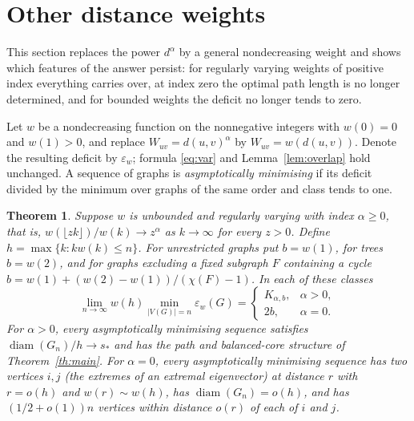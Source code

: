 \documentclass[11pt,a4paper]{article}
\newtheorem{theorem}{Theorem}
\theoremstyle{definition}
\newcommand{\eps}{\varepsilon}
\newcommand{\diam}{\operatorname{diam}}
\begin{document}
\section{Other distance weights}\label{sec:weights}
This section replaces the power $d^\alpha$ by a general nondecreasing weight and shows which features of the answer persist: for regularly varying weights of positive index everything carries over, at index zero the optimal path length is no longer determined, and for bounded weights the deficit no longer tends to zero.

Let $w$ be a nondecreasing function on the nonnegative integers with $w(0)=0$ and $w(1)>0$, and replace $W_{uv}=d(u,v)^\alpha$ by $W_{uv}=w(d(u,v))$. Denote the resulting deficit by $\eps_w$; formula \eqref{eq:var} and Lemma~\ref{lem:overlap} hold unchanged. A sequence of graphs is \emph{asymptotically minimising} if its deficit divided by the minimum over graphs of the same order and class tends to one.

\begin{theorem}\label{th:regular}
Suppose $w$ is unbounded and regularly varying with index $\alpha\ge0$, that is, $w(\lfloor zk\rfloor)/w(k)\to z^\alpha$ as $k\to\infty$ for every $z>0$. Define $h=\max\{k:kw(k)\le n\}$. For unrestricted graphs put $b=w(1)$, for trees $b=w(2)$, and for graphs excluding a fixed subgraph $F$ containing a cycle $b=w(1)+(w(2)-w(1))/(\chi(F)-1)$. In each of these classes
\[
 \lim_{n\to\infty} w(h)\min_{|V(G)|=n}\eps_w(G)
 =\begin{cases} K_{\alpha,b},&\alpha>0,\\2b,&\alpha=0.\end{cases}
\]
For $\alpha>0$, every asymptotically minimising sequence satisfies $\diam(G_n)/h\to s_*$ and has the path and balanced-core structure of Theorem~\ref{th:main}. For $\alpha=0$, every asymptotically minimising sequence has two vertices $i,j$ (the extremes of an extremal eigenvector) at distance $r$ with $r=o(h)$ and $w(r)\sim w(h)$, has $\diam(G_n)=o(h)$, and has $(1/2+o(1))n$ vertices within distance $o(r)$ of each of $i$ and $j$.
\end{theorem}
\end{document}
